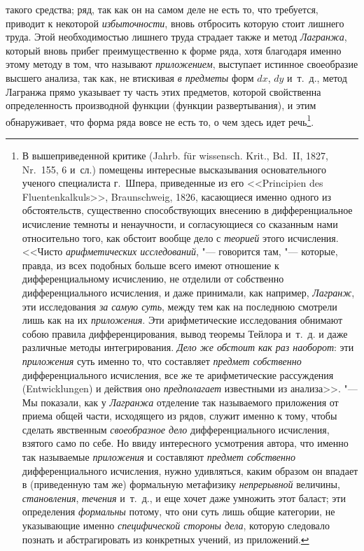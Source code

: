 такого средства; ряд, так как он на самом деле не есть то, что требуется,
приводит к некоторой {\em избыточности}, вновь отбросить которую стоит лишнего
труда. Этой необходимостью лишнего труда страдает также и метод {\em Лагранжа},
который вновь прибег преимущественно к форме ряда, хотя благодаря именно этому
методу в том, что называют {\em приложением}, выступает истинное своеобразие
высшего анализа, так как, не втискивая {\em в предметы} форм $dx$, $dy$
и~т.~д., метод Лагранжа прямо указывает ту часть этих предметов, которой
свойственна определенность производной функции (функции развертывания), и этим
обнаруживает, что форма ряда вовсе не есть то, о чем здесь идет речь\footnote{В
вышеприведенной критике (Jahrb. für wissensch. Krit., Bd.~II, 1827, Nr.~155, 6
и~сл.) помещены интересные высказывания основательного ученого специалиста
г.~Шпера, приведенные из его <<Principien des Fluentenkalkuls>>, Braunschweig,
1826, касающиеся именно одного из обстоятельств, существенно способствующих
внесению в дифференциальное исчисление темноты и ненаучности, и согласующиеся
со сказанным нами относительно того, как обстоит вообще дело с {\em теорией}
этого исчисления. <<Чисто {\em арифметических исследований}, "--- говорится
там, "--- которые, правда, из всех подобных больше всего имеют отношение к
дифференциальному исчислению, не отделили от собственно дифференциального
исчисления, и даже принимали, как например, {\em Лагранж}, эти исследования
{\em за самую суть}, между тем как на последнюю смотрели лишь как на их
{\em приложения}. Эти арифметические исследования обнимают собою правила
дифференцирования, вывод теоремы Тейлора и~т.~д. и даже различные методы
интегрирования. {\em Дело же обстоит как раз наоборот}: эти {\em приложения}
суть именно то, что составляет {\em предмет собственно} дифференциального
исчисления, все же те арифметические рассуждения (Entwicklungen) и действия оно
{\em предполагает} известными из анализа>>. "--- Мы показали, как у
{\em Лагранжа} отделение так называемого приложения от приема общей части,
исходящего из рядов, служит именно к тому, чтобы сделать явственным
{\em своеобразное дело} дифференциального исчисления, взятого само по себе. Но
ввиду интересного усмотрения автора, что именно так называемые {\em приложения}
и составляют {\em предмет собственно} дифференциального исчисления, нужно
удивляться, каким образом он впадает в (приведенную там же) формальную
метафизику {\em непрерывной} величины, {\em становления}, {\em течения}
и~т.~д., и еще хочет даже умножить этот баласт; эти определения {\em формальны}
потому, что они суть лишь общие категории, не указывающие именно
{\em специфической стороны дела}, которую следовало познать и абстрагировать из
конкретных учений, из приложений.}.

